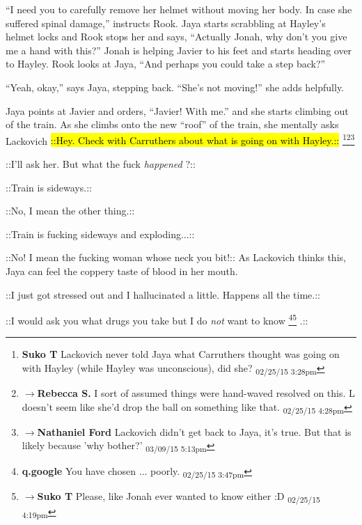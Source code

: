``I need you to carefully remove her helmet without moving her body.  In case she suffered spinal damage,'' instructs Rook.  Jaya starts scrabbling at Hayley's helmet locks and Rook stops her and says, ``Actually Jonah, why don't you give me a hand with this?''  Jonah is helping Javier to his feet and starts heading over to Hayley.  Rook looks at Jaya, ``And perhaps you could take a step back?''

``Yeah, okay,'' says Jaya, stepping back.  ``She's not moving!'' she adds helpfully.

Jaya points at Javier and orders, ``Javier!  With me.'' and she starts climbing out of the train.  As she climbs onto the new ``roof'' of the train, she mentally asks Lackovich  {\color[RGB]{255,0,0}\hl{::Hey.  Check with Carruthers about what is going on with Hayley.::}} \footnote{\textbf{Suko T }Lackovich never told Jaya what Carruthers thought was going on with Hayley (while Hayley was unconscious), did she? \textsubscript{02/25/15 3:28pm}}\footnote{$\rightarrow$\textbf{Rebecca S. }I sort of assumed things were hand-waved resolved on this.  L doesn't seem like she'd drop the ball on something like that. \textsubscript{02/25/15 4:28pm}}\footnote{$\rightarrow$\textbf{Nathaniel Ford }Lackovich didn't get back to Jaya, it's true. But that is likely because 'why bother?' \textsubscript{03/09/15 5:13pm}}

 {\color[RGB]{74,134,232}::I'll ask her.  But what the fuck } \textit{ {\color[RGB]{74,134,232}happened} } {\color[RGB]{74,134,232}?::} 

 {\color[RGB]{255,0,0}::Train is sideways.::} 

 {\color[RGB]{74,134,232}::No, I mean the other thing.::} 

 {\color[RGB]{255,0,0}::Train is fucking sideways and exploding...::} 

 {\color[RGB]{74,134,232}::No!  I mean the fucking woman whose neck you bit!:: }  As Lackovich thinks this, Jaya can feel the coppery taste of blood in her mouth.

 {\color[RGB]{255,0,0}::I just got stressed out and I hallucinated a little.  Happens all the time.::} 

 {\color[RGB]{74,134,232}::I would ask you what drugs you take but }  {\color[RGB]{74,134,232}I do } \textit{ {\color[RGB]{74,134,232}not} } {\color[RGB]{74,134,232} want to know} \footnote{\textbf{q.google }You have chosen ... poorly. \textsubscript{02/25/15 3:47pm}}\footnote{$\rightarrow$\textbf{Suko T }Please, like Jonah ever wanted to know either :D \textsubscript{02/25/15 4:19pm}} {\color[RGB]{74,134,232}.::} 

